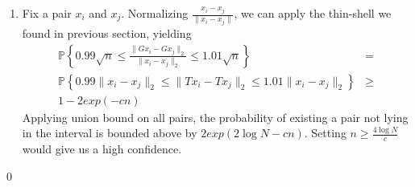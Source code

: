 \documentclass[12pt]{article}
\begin{document}
\begin{bx}
\begin{enumerate}[label=(\alph*)]
\item Fix a pair $x_i$ and $x_j$. Normalizing $\frac{x_i-x_j}{\|x_i-x_j\|}$, we can apply the thin-shell we found in previous section, yielding
\begin{align*}
\mathbb{P}\left \{0.99\sqrt{n} \le \frac{\|Gx_i-Gx_j\|_2}{\|x_i-x_j\|_2} \le 1.01\sqrt{n} \right \} &=\\
\mathbb{P}\left \{0.99 \|x_i-x_j\|_2 \le \|{Tx_i-Tx_j}\|_2 \le 1.01 \|x_i-x_j\|_2 \right \} &\ge\\ 1-2exp(-cn)
\end{align*}
Applying union bound on all pairs, the probability of existing a pair not lying in the interval is bounded above by $2exp(2\log N-cn)$. Setting $n\ge \frac{4\log N}{c}$ would give us a high confidence.
	\end{enumerate}
	\qed
\end{bx}
\end{document}
